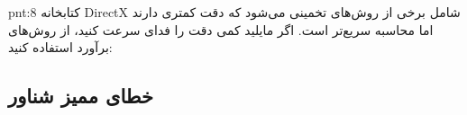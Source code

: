 {\begin{spacing}{1.5}
        \begin{point}{pnt:8}
            \Large
            کتابخانه DirectX شامل برخی از روش‌های تخمینی می‌شود که دقت کمتری دارند اما محاسبه سریع‌تر است.
            اگر مایلید کمی دقت را فدای سرعت کنید، از روش‌های برآورد استفاده کنید:
            \textbf{\vspace{6pt}}
            \lr{}
            \textbf{\vspace{-40pt}}
        \end{point}
    \end{spacing}
}

\subsection{\textbf{خطای ممیز شناور}}
